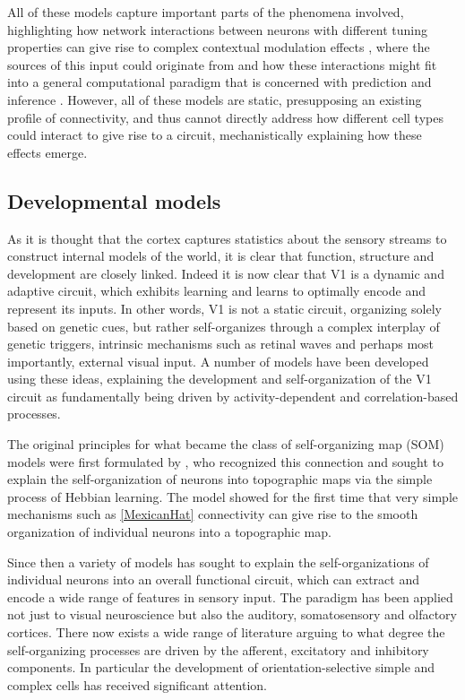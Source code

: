 All of these models capture important parts of the phenomena involved,
highlighting how network interactions between neurons with different
tuning properties can give rise to complex contextual modulation
effects \citep{Li2002}, where the sources of this input could
originate from \citep{Schwabe2006} and how these interactions might
fit into a general computational paradigm that is concerned with
prediction and inference \citep{Spratling2010, Coen2015}. However, all
of these models are static, presupposing an existing profile of
connectivity, and thus cannot directly address how different cell
types could interact to give rise to a circuit, mechanistically
explaining how these effects emerge.

\subsection{Developmental models} \label{devmodels}

As it is thought that the cortex captures statistics about the sensory
streams to construct internal models of the world, it is clear that
function, structure and development are closely linked. Indeed it is
now clear that V1 is a dynamic and adaptive circuit, which exhibits
learning and learns to optimally encode and represent its inputs. In
other words, V1 is not a static circuit, organizing solely based on
genetic cues, but rather self-organizes through a complex interplay of
genetic triggers, intrinsic mechanisms such as retinal waves and
perhaps most importantly, external visual input. A number of models
have been developed using these ideas, explaining the development and
self-organization of the V1 circuit as fundamentally being driven by
activity-dependent and correlation-based processes.

The original principles for what became the class of self-organizing
map (SOM) models were first formulated by \citep{VonderMalsburg1973},
who recognized this connection and sought to explain the
self-organization of neurons into topographic maps via the simple
process of Hebbian learning. The \cite{VonderMalsburg1973} model
showed for the first time that very simple mechanisms such as
\ref{MexicanHat} connectivity can give rise to the smooth organization
of individual neurons into a topographic map.

Since then a variety of models has sought to explain the
self-organizations of individual neurons into an overall functional
circuit, which can extract and encode a wide range of features in
sensory input. The paradigm has been applied not just to visual
neuroscience but also the auditory, somatosensory and olfactory
cortices. There now exists a wide range of literature arguing to what
degree the self-organizing processes are driven by the afferent,
excitatory and inhibitory components. In particular the development of
orientation-selective simple and complex cells has received
significant attention.

